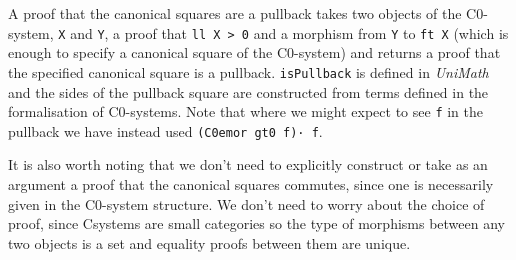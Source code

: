 A proof that the canonical squares are a pullback takes two objects of the
C0-system, \lstinline|X| and \lstinline|Y|, a proof that \lstinline|ll X > 0|
and a morphism from \lstinline|Y| to \lstinline|ft X| (which is enough to
specify a canonical square of the C0-system) and returns a proof that the
specified canonical square is a pullback. \lstinline|isPullback| is defined in
\textit{UniMath} and the sides of the pullback square are constructed from terms
defined in the formalisation of C0-systems. Note that where we might expect to
see \lstinline|f| in the pullback we have instead used 
\lstinline|(C0emor gt0 f)· f|.

It is also worth noting that we don't need to explicitly construct or take as an
argument a proof that the canonical squares commutes, since one is necessarily
given in the C0-system structure. We don't need to worry about the choice of
proof, since Csystems are small categories so the type of morphisms between any
two objects is a set and equality proofs between them are unique.